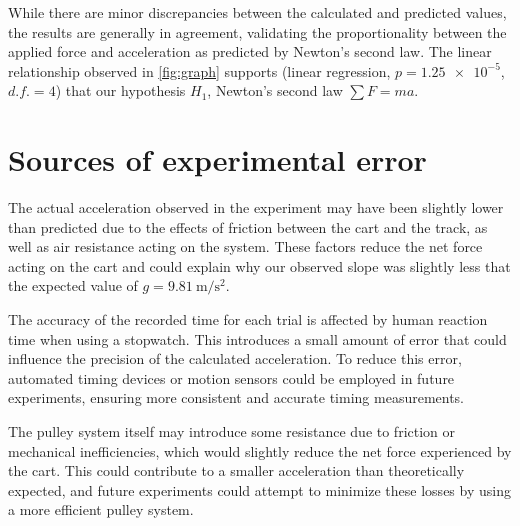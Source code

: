 ﻿\documentclass[reprint,amsmath,amssymb,aps]{revtex4-2}
\begin{document}
While there are minor discrepancies between the calculated and predicted values, the results are generally in agreement, validating the proportionality between the applied force and acceleration as predicted by Newton's second law. The linear relationship observed in \cref{fig:graph} supports (linear regression, $p=\num{1.25e-5}$, $d.f.=4$) that our hypothesis $H_1$, Newton's second law $\sum F = ma$.

 

\section{Sources of experimental error}
The actual acceleration observed in the experiment may have been slightly lower than predicted due to the effects of friction between the cart and the track, as well as air resistance acting on the system. These factors reduce the net force acting on the cart and could explain why our observed slope was slightly less that the expected value of $g=\qty{9.81}{\meter\per\second\squared}$.

The accuracy of the recorded time for each trial is affected by human reaction time when using a stopwatch. This introduces a small amount of error that could influence the precision of the calculated acceleration. To reduce this error, automated timing devices or motion sensors could be employed in future experiments, ensuring more consistent and accurate timing measurements.

The pulley system itself may introduce some resistance due to friction or mechanical inefficiencies, which would slightly reduce the net force experienced by the cart. This could contribute to a smaller acceleration than theoretically expected, and future experiments could attempt to minimize these losses by using a more efficient pulley system.
\end{document}
